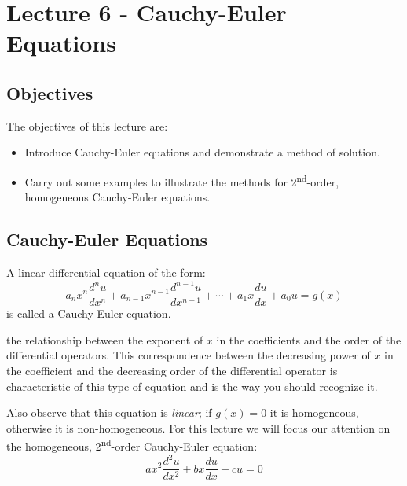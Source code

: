\chapter{Lecture 6 - Cauchy-Euler Equations}
\label{ch:lec6}
\section{Objectives}
The objectives of this lecture are:
\begin{itemize}
\item Introduce Cauchy-Euler equations and demonstrate a method of solution.
\item Carry out some examples to illustrate the methods for 2\textsuperscript{nd}-order, homogeneous Cauchy-Euler equations.
\end{itemize}

\section{Cauchy-Euler Equations} 

A linear differential equation of the form:
\begin{equation}
a_nx^n\frac{d^n u}{dx^n}+a_{n-1}x^{n-1}\frac{d^{n-1}u}{dx^{n-1}}+\cdots+a_1x\frac{du}{dx}+a_0u=g(x)
\label{eq:cauchy-euler-eqn}
\end{equation}
is called a Cauchy-Euler equation.

 the relationship between the exponent of $x$ in the coefficients and the order of the differential operators.  This correspondence between the decreasing power of $x$ in the coefficient and the decreasing order of the differential operator is characteristic of this type of equation and is the way you should recognize it. 

Also observe that this equation is \emph{linear}; if $g(x)=0$ it is homogeneous, otherwise it is non-homogeneous.  For this lecture we will focus our attention on the homogeneous, 2\textsuperscript{nd}-order Cauchy-Euler equation:
\begin{equation}
ax^2\frac{d^2u}{dx^2}+bx\frac{du}{dx}+cu=0
\end{equation}

